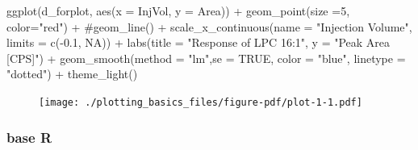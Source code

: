 \documentclass[
  letterpaper,
  DIV=11,
  numbers=noendperiod]{scrreprt}
\newenvironment{Shaded}{\begin{snugshade}}{\end{snugshade}}
\newcommand{\AttributeTok}[1]{\textcolor[rgb]{0.40,0.45,0.13}{#1}}
\newcommand{\CommentTok}[1]{\textcolor[rgb]{0.37,0.37,0.37}{#1}}
\newcommand{\ConstantTok}[1]{\textcolor[rgb]{0.56,0.35,0.01}{#1}}
\newcommand{\DecValTok}[1]{\textcolor[rgb]{0.68,0.00,0.00}{#1}}
\newcommand{\FloatTok}[1]{\textcolor[rgb]{0.68,0.00,0.00}{#1}}
\newcommand{\FunctionTok}[1]{\textcolor[rgb]{0.28,0.35,0.67}{#1}}
\newcommand{\NormalTok}[1]{\textcolor[rgb]{0.00,0.23,0.31}{#1}}
\newcommand{\SpecialCharTok}[1]{\textcolor[rgb]{0.37,0.37,0.37}{#1}}
\newcommand{\StringTok}[1]{\textcolor[rgb]{0.13,0.47,0.30}{#1}}
\begin{document}
\begin{Shaded}
\begin{Highlighting}[]
\FunctionTok{ggplot}\NormalTok{(d\_forplot, }\FunctionTok{aes}\NormalTok{(}\AttributeTok{x =}\NormalTok{ InjVol, }\AttributeTok{y =}\NormalTok{ Area)) }\SpecialCharTok{+} 
  \FunctionTok{geom\_point}\NormalTok{(}\AttributeTok{size =}\DecValTok{5}\NormalTok{, }\AttributeTok{color=}\StringTok{"red"}\NormalTok{) }\SpecialCharTok{+}
  \CommentTok{\#geom\_line() +}
  \FunctionTok{scale\_x\_continuous}\NormalTok{(}\AttributeTok{name =} \StringTok{"Injection Volume"}\NormalTok{, }\AttributeTok{limits =} \FunctionTok{c}\NormalTok{(}\SpecialCharTok{{-}}\FloatTok{0.1}\NormalTok{, }\ConstantTok{NA}\NormalTok{)) }\SpecialCharTok{+} 
  \FunctionTok{labs}\NormalTok{(}\AttributeTok{title =} \StringTok{"Response of LPC 16:1"}\NormalTok{, }\AttributeTok{y =} \StringTok{"Peak Area [CPS]"}\NormalTok{) }\SpecialCharTok{+}
  \FunctionTok{geom\_smooth}\NormalTok{(}\AttributeTok{method =} \StringTok{"lm"}\NormalTok{,}\AttributeTok{se =} \ConstantTok{TRUE}\NormalTok{, }\AttributeTok{color =} \StringTok{"blue"}\NormalTok{, }\AttributeTok{linetype =} \StringTok{"dotted"}\NormalTok{) }\SpecialCharTok{+}
  \FunctionTok{theme\_light}\NormalTok{()}
\end{Highlighting}
\end{Shaded}

\begin{figure}[H]

{\centering \texttt{[image: ./plotting\_basics\_files/figure-pdf/plot-1-1.pdf]}

}

\end{figure}

\hypertarget{base-r}{%
\subsubsection{base R}\label{base-r}}

\begin{Shaded}
\end{Shaded}
\end{document}
